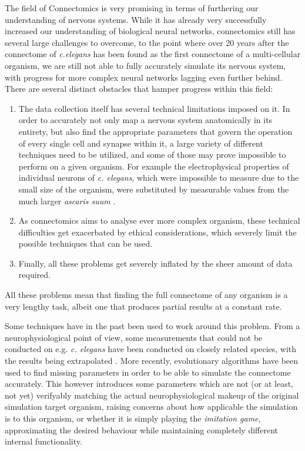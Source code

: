 \documentclass[a4paper,11pt]{article}
\begin{document}
The field of Connectomics is very promising in terms of furthering our understanding of nervous systems. While it has already very successfully increased our understanding of biological neural networks, connectomics still has several large challenges to overcome, to the point where over 20 years after the connectome of \emph{c.elegans} has been found as the first connectome of a multi-cellular organism, we are still not able to fully accurately simulate its nervous system, with progress for more complex neural networks lagging even further behind. There are several distinct obstacles that hamper progress within this field:
\begin{enumerate}
\item The data collection itself has several technical limitations imposed on it. In order to accurately not only map a nervous system anatomically in its entirety, but also find the appropriate parameters that govern the operation of every single cell and synapse within it, a large variety of different techniques need to be utilized, and some of those may prove impossible to perform on a given organism. For example the electrophysical properties of individual neurons of \emph{c. elegans}, which were impossible to measure due to the small size of the organism, were substituted by measurable values from the much larger \emph{ascaris suum} \citep{ThatBlueBook}. 
\item As connectomics aims to analyse ever more complex organism, these technical difficulties get exacerbated by ethical considerations, which severely limit the possible techniques that can be used.
\item Finally, all these problems get severely inflated by the sheer amount of data required.
\end{enumerate}

All these problems mean that finding the full connectome of any organism is a very lengthy task, albeit one that produces partial results at a constant rate. 

Some techniques have in the past been used to work around this problem. From a neurophysiological point of view, some measurements that could not be conducted on e.g. \emph{c. elegans} have been conducted on closely related species, with the results being extrapolated \citep{ThatBlueBook}. More recently, evolutionary algorithms have been used to find missing parameters in order to be able to simulate the connectome accurately. This however introduces some parameters which are not (or at least, not yet) verifyably matching the actual neurophysiological makeup of the original simulation target organism, raising concerns about how applicable the simulation is to this organism, or whether it is simply playing the \emph{imitation game}, approximating the desired behaviour while maintaining completely different internal functionality.
\end{document}
